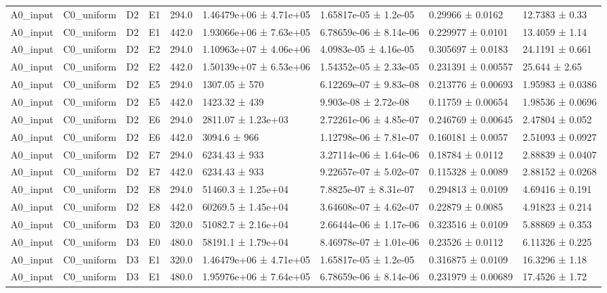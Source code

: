 \begin{table}
\begin{tabular}{lllllllll}
A0\_input & C0\_uniform & D2 & E1 & 294.0 & 1.46479e+06 ± 4.71e+05 & 1.65817e-05 ± 1.2e-05 & 0.29966 ± 0.0162 & 12.7383 ± 0.33 \\
A0\_input & C0\_uniform & D2 & E1 & 442.0 & 1.93066e+06 ± 7.63e+05 & 6.78659e-06 ± 8.14e-06 & 0.229977 ± 0.0101 & 13.4059 ± 1.14 \\
A0\_input & C0\_uniform & D2 & E2 & 294.0 & 1.10963e+07 ± 4.06e+06 & 4.0983e-05 ± 4.16e-05 & 0.305697 ± 0.0183 & 24.1191 ± 0.661 \\
A0\_input & C0\_uniform & D2 & E2 & 442.0 & 1.50139e+07 ± 6.53e+06 & 1.54352e-05 ± 2.33e-05 & 0.231391 ± 0.00557 & 25.644 ± 2.65 \\
A0\_input & C0\_uniform & D2 & E5 & 294.0 & 1307.05 ± 570 & 6.12269e-07 ± 9.83e-08 & 0.213776 ± 0.00693 & 1.95983 ± 0.0386 \\
A0\_input & C0\_uniform & D2 & E5 & 442.0 & 1423.32 ± 439 & 9.903e-08 ± 2.72e-08 & 0.11759 ± 0.00654 & 1.98536 ± 0.0696 \\
A0\_input & C0\_uniform & D2 & E6 & 294.0 & 2811.07 ± 1.23e+03 & 2.72261e-06 ± 4.85e-07 & 0.246769 ± 0.00645 & 2.47804 ± 0.052 \\
A0\_input & C0\_uniform & D2 & E6 & 442.0 & 3094.6 ± 966 & 1.12798e-06 ± 7.81e-07 & 0.160181 ± 0.0057 & 2.51093 ± 0.0927 \\
A0\_input & C0\_uniform & D2 & E7 & 294.0 & 6234.43 ± 933 & 3.27114e-06 ± 1.64e-06 & 0.18784 ± 0.0112 & 2.88839 ± 0.0407 \\
A0\_input & C0\_uniform & D2 & E7 & 442.0 & 6234.43 ± 933 & 9.22657e-07 ± 5.02e-07 & 0.115328 ± 0.0089 & 2.88152 ± 0.0268 \\
A0\_input & C0\_uniform & D2 & E8 & 294.0 & 51460.3 ± 1.25e+04 & 7.8825e-07 ± 8.31e-07 & 0.294813 ± 0.0109 & 4.69416 ± 0.191 \\
A0\_input & C0\_uniform & D2 & E8 & 442.0 & 60269.5 ± 1.45e+04 & 3.64608e-07 ± 4.62e-07 & 0.22879 ± 0.0085 & 4.91823 ± 0.214 \\
A0\_input & C0\_uniform & D3 & E0 & 320.0 & 51082.7 ± 2.16e+04 & 2.66444e-06 ± 1.17e-06 & 0.323516 ± 0.0109 & 5.88869 ± 0.353 \\
A0\_input & C0\_uniform & D3 & E0 & 480.0 & 58191.1 ± 1.79e+04 & 8.46978e-07 ± 1.01e-06 & 0.23526 ± 0.0112 & 6.11326 ± 0.225 \\
A0\_input & C0\_uniform & D3 & E1 & 320.0 & 1.46479e+06 ± 4.71e+05 & 1.65817e-05 ± 1.2e-05 & 0.316875 ± 0.0109 & 16.3296 ± 1.18 \\
A0\_input & C0\_uniform & D3 & E1 & 480.0 & 1.95976e+06 ± 7.64e+05 & 6.78659e-06 ± 8.14e-06 & 0.231979 ± 0.00689 & 17.4526 ± 1.72 \\

\end{tabular}
\end{table}
